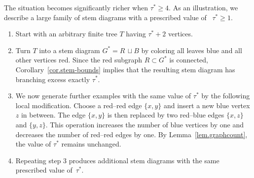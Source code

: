 \documentclass[a4paper, 11pt]{article}
\numberwithin{equation}{section}
\theoremstyle{definition}
\theoremstyle{remark}
\begin{document}
\begin{figure}[H]
\end{figure}
 
\bigskip  

The situation becomes significantly richer when $\tau^*\ge 4$. As an illustration, we describe a large family of stem diagrams with a prescribed value of \  $\tau^*\ge 1$.

\begin{enumerate}
\item
Start with an arbitrary finite tree $T$ having $\tau^*+2$ vertices.

\item
Turn $T$ into a stem diagram  $G^* = R\,  \sqcup B$ by coloring all leaves blue and all other vertices red.
Since the red  subgraph $R\subset G^*$ is connected, Corollary~\ref{cor.stem-bounds} implies
that the resulting stem diagram has branching excess exactly $\tau^*$.

\item
We  now generate further examples with the same value of $\tau^*$ by the following
local modification.
Choose a red--red edge $\{x,y\}$ and insert a new blue vertex $z$ in between.
The edge $\{x,y\}$ is then replaced by two red--blue edges $\{x,z\}$ and $\{y,z\}$.
This operation increases the number of blue vertices by one and decreases the number
of red--red edges by one.
By Lemma~\ref{lem.graphcount}, the value of $\tau^*$ remains unchanged.

\item
Repeating step 3 produces additional stem diagrams with the same prescribed value of~$\tau^*$.
\end{enumerate}
\end{document}
